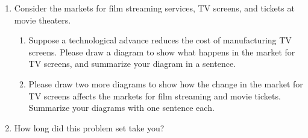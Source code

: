 \documentclass{article}
\begin{document}
\begin{enumerate}
\item Consider the markets for film streaming services, TV screens, and tickets at movie theaters.

	\begin{enumerate}
	
	\item Suppose a technological advance reduces the cost of manufacturing TV screens. Please draw a diagram to show what happens in the market for TV screens, and summarize your diagram in a sentence.
	
	\item Please draw two more diagrams to show how the change in the market for TV screens affects the markets for film streaming and movie tickets. Summarize your diagrams with one sentence each. 
	
	\end{enumerate}
	
\item How long did this problem set take you?

\end{enumerate}
\end{document}
